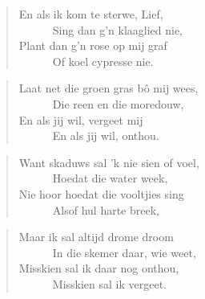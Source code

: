 \begin{verse}
En als ik kom te sterwe, Lief, \\ 
\ \ \ \ \ \ Sing dan g’n klaaglied nie, \\ 
Plant dan g’n rose op mij graf \\ 
\ \ \ \ \ \ Of koel cypresse nie. \\ 
\end{verse}

\begin{verse}
Laat net die groen gras bô mij wees, \\ 
\ \ \ \ \ \ Die reen en die moredouw, \\ 
En als jij wil, vergeet mij \\ 
\ \ \ \ \ \ En als jij wil, onthou. \\ 
\end{verse}

\begin{verse}
Want skaduws sal ’k nie sien of voel, \\ 
\ \ \ \ \ \ Hoedat die water week, \\ 
Nie hoor hoedat die vooltjies sing \\ 
\ \ \ \ \ \ Alsof hul harte breek, \\ 
\end{verse}

\begin{verse}
Maar ik sal altijd drome droom \\ 
\ \ \ \ \ \ In die skemer daar, wie weet, \\ 
Misskien sal ik daar nog onthou, \\ 
\ \ \ \ \ \ Misskien sal ik vergeet. \\ 
\end{verse}